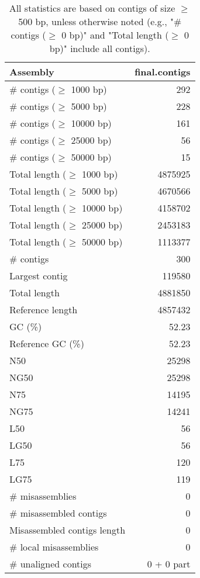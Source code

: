 \documentclass[12pt,a4paper]{article}
\begin{document}
\begin{table}[ht]
\begin{center}
\caption{All statistics are based on contigs of size $\geq$ 500 bp, unless otherwise noted (e.g., "\# contigs ($\geq$ 0 bp)" and "Total length ($\geq$ 0 bp)" include all contigs).}
\begin{tabular}{|l*{1}{|r}|}
\hline
Assembly & final.contigs \\ \hline
\# contigs ($\geq$ 1000 bp) & 292 \\ \hline
\# contigs ($\geq$ 5000 bp) & 228 \\ \hline
\# contigs ($\geq$ 10000 bp) & 161 \\ \hline
\# contigs ($\geq$ 25000 bp) & 56 \\ \hline
\# contigs ($\geq$ 50000 bp) & 15 \\ \hline
Total length ($\geq$ 1000 bp) & 4875925 \\ \hline
Total length ($\geq$ 5000 bp) & 4670566 \\ \hline
Total length ($\geq$ 10000 bp) & 4158702 \\ \hline
Total length ($\geq$ 25000 bp) & 2453183 \\ \hline
Total length ($\geq$ 50000 bp) & 1113377 \\ \hline
\# contigs & 300 \\ \hline
Largest contig & 119580 \\ \hline
Total length & 4881850 \\ \hline
Reference length & 4857432 \\ \hline
GC (\%) & 52.23 \\ \hline
Reference GC (\%) & 52.23 \\ \hline
N50 & 25298 \\ \hline
NG50 & 25298 \\ \hline
N75 & 14195 \\ \hline
NG75 & 14241 \\ \hline
L50 & 56 \\ \hline
LG50 & 56 \\ \hline
L75 & 120 \\ \hline
LG75 & 119 \\ \hline
\# misassemblies & 0 \\ \hline
\# misassembled contigs & 0 \\ \hline
Misassembled contigs length & 0 \\ \hline
\# local misassemblies & 0 \\ \hline
\# unaligned contigs & 0 + 0 part \\ \hline

\end{tabular}
\end{center}
\end{table}
\end{document}
